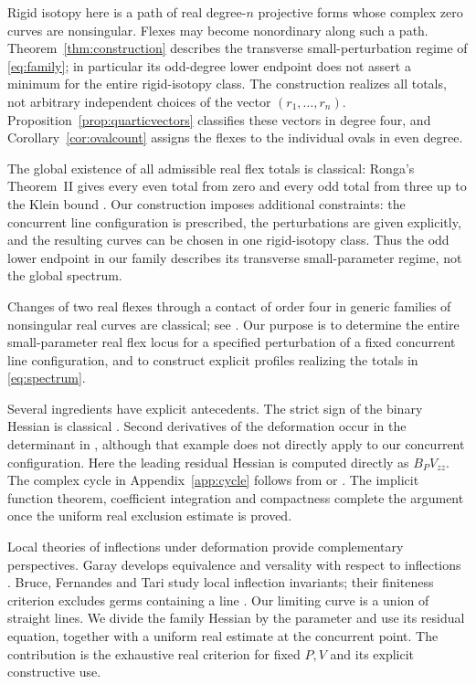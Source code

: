 \documentclass[11pt,a4paper]{article}
\theoremstyle{remark}
\begin{document}
Rigid isotopy here is a path of real degree-\(n\) projective forms
whose complex zero curves are nonsingular. Flexes may become
nonordinary along such a path. Theorem~\ref{thm:construction}
describes the transverse small-perturbation regime of
\eqref{eq:family}; in particular its odd-degree lower endpoint
does not assert a minimum for the entire rigid-isotopy class.
The construction realizes all totals, not arbitrary independent
choices of the vector \((r_1,\ldots,r_n)\). Proposition~\ref{prop:quarticvectors}
classifies these vectors in degree four, and Corollary~\ref{cor:ovalcount}
assigns the flexes to the individual ovals in even degree.

The global existence of all admissible real flex totals is classical:
Ronga's Theorem~II gives every even total from zero and every odd
total from three up to the Klein bound \citep[Theorem~II, p.~197]{ronga}.
Our construction imposes additional constraints: the concurrent line
configuration is prescribed, the perturbations are given explicitly,
and the resulting curves can be chosen in one rigid-isotopy class.
Thus the odd lower endpoint in our family describes its transverse
small-parameter regime, not the global spectrum.

Changes of two real flexes through a contact of order four in generic
families of nonsingular real curves are classical; see
\citep[Section~3.1]{arroyoetal}. Our purpose is to determine the entire
small-parameter real flex locus for a specified perturbation of a
fixed concurrent line configuration, and to construct explicit
profiles realizing the totals in \eqref{eq:spectrum}.

Several ingredients have explicit antecedents. The strict sign of
the binary Hessian is classical \citep{causare}. Second derivatives
of the deformation occur in the determinant in
\citep[Example~5.3]{esteves}, although that example does not directly
apply to our concurrent configuration. Here the leading residual
Hessian is computed directly as \(B_PV_{zz}\). The complex cycle in
Appendix~\ref{app:cycle} follows from
\citep[Theorem~4.1]{esteves} or \citep[Proposition~5.2]{ems}.
The implicit function theorem, coefficient integration and compactness
complete the argument once the uniform real exclusion estimate is proved.

Local theories of inflections under deformation provide complementary
perspectives. Garay develops equivalence and versality with respect
to inflections \citep[Sections~3.2--3.6]{garay}.
Bruce, Fernandes and Tari study local inflection invariants; their
finiteness criterion excludes germs containing a line
\citep[Theorem~3.3(7) in the arXiv version]{bruceetal}.
Our limiting curve is a union of straight lines. We divide the
family Hessian by the parameter and use its residual equation,
together with a uniform real estimate at the concurrent point.
The contribution is the exhaustive real criterion for fixed \(P,V\)
and its explicit constructive use.
\end{document}

